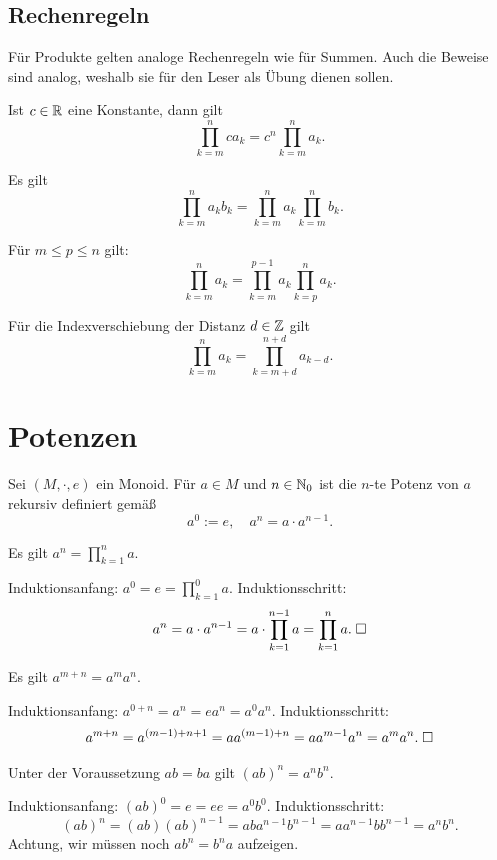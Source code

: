 \subsection{Rechenregeln}
Für Produkte gelten analoge Rechenregeln wie für Summen. Auch
die Beweise sind analog, weshalb sie für den Leser als Übung
dienen sollen.%
\begin{Satz}
Ist $c\in\mathbb R$ eine Konstante, dann gilt%
\[\prod_{k=m}^n ca_k = c^n\prod_{k=m}^n a_k.\]
\end{Satz}
\begin{Satz}
Es gilt
\[\prod_{k=m}^n a_k b_k = \prod_{k=m}^n a_k \prod_{k=m}^n b_k.\]
\end{Satz}
\begin{Satz}\label{Prod-Aufteilung}
Für $m\le p\le n$ gilt:
\[\prod_{k=m}^n a_k = \prod_{k=m}^{p-1} a_k\prod_{k=p}^n a_k.\]
\end{Satz}
\begin{Satz}[Indexshift]\label{Prod-Indexshift}
Für die Indexverschiebung der Distanz $d\in\mathbb Z$ gilt%
\[\prod_{k=m}^n a_k = \prod_{k=m+d}^{n+d} a_{k-d}.\]
\end{Satz}

\newpage
\section{Potenzen}

\begin{Definition}
Sei $(M,\cdot,e)$ ein Monoid. Für $a\in M$ und $n\in\mathbb N_0$ ist die
$n$-te Potenz von $a$ rekursiv definiert gemäß
\[a^0 := e, \quad a^n = a\cdot a^{n-1}.\]
\end{Definition}
\begin{Satz}
Es gilt $a^n = \prod_{k=1}^n a$.
\end{Satz}
 Induktionsanfang: $a^0=e=\prod_{k=1}^0 a$.
Induktionsschritt:
\[a^n = a\cdot a^{n-1} = a\cdot\prod_{k=1}^{n-1} a
= \prod_{k=1}^n a.\;\Box\]

\begin{Satz}
Es gilt $a^{m+n}=a^m a^n$.
\end{Satz}
 Induktionsanfang:
$a^{0+n} = a^n = ea^n = a^0 a^n$.
Induktionsschritt:
\[a^{m+n} = a^{(m-1)+n+1} = aa^{(m-1)+n} = aa^{m-1}a^n
= a^m a^n.\;\Box\]

\begin{Satz}
Unter der Voraussetzung $ab=ba$ gilt $(ab)^n = a^n b^n$.
\end{Satz}
 Induktionsanfang: $(ab)^0 = e = ee = a^0 b^0$.
Induktionsschritt:
\[(ab)^n = (ab)(ab)^{n-1} = aba^{n-1}b^{n-1}
= aa^{n-1}bb^{n-1} = a^n b^n.\]
Achtung, wir müssen noch $ab^n = b^na$ aufzeigen.

